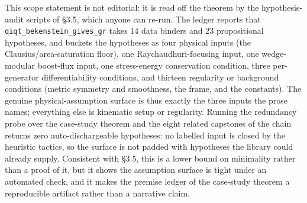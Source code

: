\documentclass[11pt]{article}
\begin{document}
This scope statement is not editorial: it is read off the theorem by the hypothesis-audit scripts of
§3.5, which anyone can re-run. The ledger reports that \texttt{qiqt\_bekenstein\_gives\_gr} takes 14
data binders and 23 propositional hypotheses, and buckets the hypotheses as four physical inputs (the
Clausius/area-saturation floor), one Raychaudhuri-focusing input, one wedge-modular boost-flux input,
one stress-energy conservation condition, three per-generator differentiability conditions, and
thirteen regularity or background conditions (metric symmetry and smoothness, the frame, and the
constants). The genuine physical-assumption surface is thus exactly the three inputs the prose names;
everything else is kinematic setup or regularity. Running the redundancy probe over the case-study
theorem and the eight related capstones of the chain returns zero auto-dischargeable hypotheses: no
labelled input is closed by the heuristic tactics, so the surface is not padded with hypotheses the
library could already supply. Consistent with §3.5, this is a lower bound on minimality rather than a
proof of it, but it shows the assumption surface is tight under an automated check, and it makes the
premise ledger of the case-study theorem a reproducible artifact rather than a narrative claim.
\end{document}
